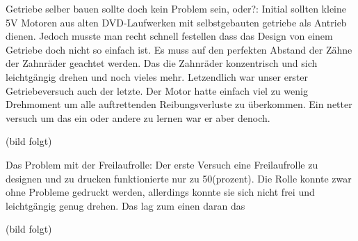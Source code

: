 \begin{flushleft}
    Getriebe selber bauen sollte doch kein Problem sein, oder?:
    Initial sollten kleine 5V Motoren aus alten DVD-Laufwerken mit selbstgebauten getriebe als Antrieb dienen.
    Jedoch musste man recht schnell festellen dass das Design von einem Getriebe doch nicht so einfach ist.
    Es muss auf den perfekten Abstand der Zähne der Zahnräder geachtet werden. Das die Zahnräder konzentrisch und 
    sich leichtgängig drehen und noch vieles mehr. Letzendlich war unser erster Getriebeversuch auch der letzte.
    Der Motor hatte einfach viel zu wenig Drehmoment um alle auftrettenden Reibungsverluste zu überkommen.
    Ein netter versuch um das ein oder andere zu lernen war er aber denoch.
   
    (bild folgt)

    Das Problem mit der Freilaufrolle:
    Der erste Versuch eine Freilaufrolle zu designen und zu drucken funktionierte nur zu 50(prozent).
    Die Rolle konnte zwar ohne Probleme gedruckt werden, allerdings konnte sie sich nicht frei und leichtgängig genug drehen.
    Das lag zum einen daran das 

    (bild folgt)

\end{flushleft}